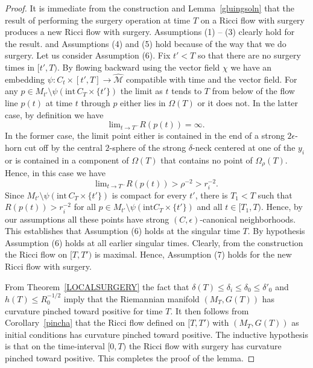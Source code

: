 \begin{proof}
It is immediate from the construction and  Lemma~\ref{gluingsoln} that
the result of performing the surgery operation at time $T$ on a Ricci flow with
surgery produces a new Ricci flow with surgery. Assumptions (1) -- (3)
clearly hold for the result. and Assumptions (4) and (5) hold because of
the way that we do surgery. Let us consider Assumption (6). Fix $t'<T$
so that there are no surgery times in $[t',T)$. By flowing backward
using the vector field $\chi$ we have an embedding $\psi\colon
C_t\times [t',T]\to \widehat {\mathcal M}$ compatible with time and
the vector field. For any $p\in M_{t'}\setminus\psi(\mathrm{int}\,C_T\times \{t'\})$ the limit as $t$ tends to $T$ from below of
the flow line $p(t)$ at time $t$ through $p$ either lies in
$\Omega(T)$ or it does not. In the latter case, by definition we
have
$$\mathrm{lim}_{t\rightarrow T^-}R(p(t))=\infty.$$
In the former case, the limit point  either is contained in the end
of a strong $2\epsilon$-horn cut off by the central $2$-sphere of
the strong $\delta$-neck centered at one of the $y_i$ or is
contained in a component of $\Omega(T)$ that contains no point of
$\Omega_\rho(T)$. Hence, in this case we have
$$\mathrm{lim}_{t\rightarrow T^-}R(p(t))>\rho^{-2}>r_i^{-2}.$$
Since $M_{t'}\setminus \psi(\mathrm{int}\,C_T\times \{t'\})$ is compact
for every $t'$, there is $T_1<T$ such that $R(p(t))>r_i^{-2}$ for
all $p\in M_{t'}\setminus \psi(\mathrm{int}C_T\times \{t'\})$ and all
$t\in [T_1,T)$. Hence, by our assumptions all these points have
strong $(C,\epsilon)$-canonical neighborhoods. This establishes that
Assumption (6) holds at the singular time $T$. By hypothesis
Assumption (6) holds at all earlier singular times. Clearly, from the
construction the Ricci flow on $[T,T')$ is maximal. Hence,
Assumption (7) holds for the new Ricci flow with surgery.

 From Theorem~\ref{LOCALSURGERY} the
fact that $\delta(T)\le \delta_i\le \delta_0\le\delta'_0$ and
$h(T)\le R_0^{-1/2}$ imply that the Riemannian manifold $(M_T,G(T))$
has curvature pinched toward positive for time $T$. It then follows
from Corollary~\ref{pincha} that  the Ricci flow defined on $[T,T')$
with $(M_T,G(T))$ as initial conditions has curvature pinched toward
positive. The inductive hypothesis is that on the time-interval
$[0,T)$ the Ricci flow with surgery has curvature pinched toward
positive. This completes the proof of the lemma.
\end{proof}

